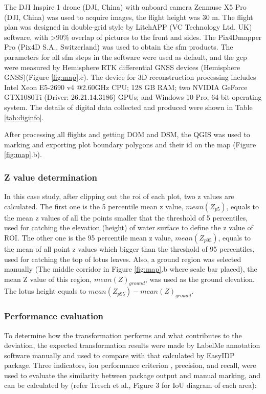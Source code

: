 \documentclass[doublespacing]{configs/bmcart}
\begin{document}
The DJI Inspire 1 drone (DJI, China) with onboard camera Zenmuse X5 Pro (DJI, China) was used to acquire images, the flight height was 30 m. The flight plan was designed in double-grid style by LitchAPP (VC Technology Ltd. UK) software, with >90\% overlap of pictures to the front and sides. The Pix4Dmapper Pro (Pix4D S.A., Switzerland) was used to obtain the \acrshort*{sfm} products. The parameters for all \acrshort*{sfm} steps in the software were used as default, and the \acrshort*{gcp} were measured by Hemisphere RTK differential GNSS devices (Hemisphere GNSS)(Figure \ref{fig:map}.c). The device for 3D reconstruction processing includes Intel Xeon E5-2690 v4 @2.60GHz CPU; 128 GB RAM; two NVIDIA GeForce GTX1080Ti (Driver: 26.21.14.3186) GPUs; and Windows 10 Pro, 64-bit operating system. The details of digital data collected and produced were shown in Table \ref{tab:diginfo}.

After processing all flights and getting DOM and DSM, the QGIS was used to marking and exporting plot boundary polygons and their id on the map (Figure \ref{fig:map}.b).

\subsubsection*{Z value determination}
In this case study, after clipping out the \acrshort*{roi} of each plot, two z values are calculated. The first one is the 5 percentile mean z value, $mean(Z_{p5})$, equals to the mean z values of all the points smaller that the threshold of 5 percentiles, used for catching the elevation (height) of water surface to define the z value of ROI. The other one is the 95 percentile mean z value,  $mean(Z_{p95})$, equals to the mean of all point z values which bigger than the threshold of 95 percentiles, used for catching the top of lotus leaves. Also, a ground region was selected manually (The middle corridor in Figure \ref{fig:map}.b where scale bar placed), the mean Z value of this region, $mean(Z)_{ground}$, was used as the ground elevation. The lotus height equals to $mean(Z_{p95}) - mean(Z)_{ground}$.

\subsubsection*{Performance evaluation}
To determine how the transformation performs and what contributes to the deviation, the expected transformation results were made by LabelMe annotation software manually and used to compare with that calculated by EasyIDP package. Three indicators, \acrfull*{iou} performance criterion \cite{everingham_pascal_2010}, precision, and recall, were used to evaluate the similarity between package output and manual marking, and can be calculated by (refer Tresch et al., \cite{tresch_easympe_2019} Figure 3 for IoU diagram of each area): 
\end{document}
